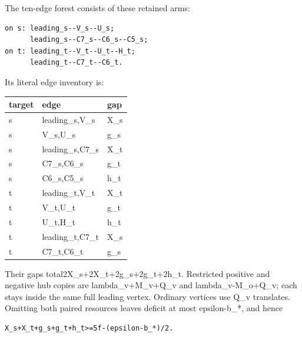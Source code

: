 \documentclass[10pt,a4paper]{article}
\theoremstyle{definition}
\begin{document}
The ten-edge forest consists of these retained arms:

\begin{lstlisting}
on s: leading_s--V_s--U_s;
      leading_s--C7_s--C6_s--C5_s;
on t: leading_t--V_t--U_t--H_t;
      leading_t--C7_t--C6_t.
\end{lstlisting}

Its literal edge inventory is:

\begin{longtable}[]{@{}lll@{}}
\toprule\noalign{}
target & edge & gap \\
\midrule\noalign{}
\endhead
\bottomrule\noalign{}
\endlastfoot
s & leading\_\allowbreak{}s,\allowbreak{}V\_\allowbreak{}s & X\_\allowbreak{}s \\
s & V\_\allowbreak{}s,\allowbreak{}U\_\allowbreak{}s & g\_\allowbreak{}s \\
s & leading\_\allowbreak{}s,\allowbreak{}C7\_\allowbreak{}s & X\_\allowbreak{}t \\
s & C7\_\allowbreak{}s,\allowbreak{}C6\_\allowbreak{}s & g\_\allowbreak{}t \\
s & C6\_\allowbreak{}s,\allowbreak{}C5\_\allowbreak{}s & h\_\allowbreak{}t \\
t & leading\_\allowbreak{}t,\allowbreak{}V\_\allowbreak{}t & X\_\allowbreak{}t \\
t & V\_\allowbreak{}t,\allowbreak{}U\_\allowbreak{}t & g\_\allowbreak{}t \\
t & U\_\allowbreak{}t,\allowbreak{}H\_\allowbreak{}t & h\_\allowbreak{}t \\
t & leading\_\allowbreak{}t,\allowbreak{}C7\_\allowbreak{}t & X\_\allowbreak{}s \\
t & C7\_\allowbreak{}t,\allowbreak{}C6\_\allowbreak{}t & g\_\allowbreak{}s \\
\end{longtable}

Their gaps total2X\_\allowbreak{}s+\allowbreak{}2X\_\allowbreak{}t+\allowbreak{}2g\_\allowbreak{}s+\allowbreak{}2g\_\allowbreak{}t+\allowbreak{}2h\_\allowbreak{}t. Restricted positive and
negative hub copies are lambda\_\allowbreak{}v+\allowbreak{}M\_\allowbreak{}v+\allowbreak{}Q\_\allowbreak{}v and lambda\_\allowbreak{}v-M\_\allowbreak{}o+\allowbreak{}Q\_\allowbreak{}v;
each stays inside the same full leading vertex. Ordinary vertices use
Q\_\allowbreak{}v translates. Omitting both paired resources leaves deficit at most
epsilon-b\_\allowbreak{}*,\allowbreak{} and hence

\begin{lstlisting}
X_s+X_t+g_s+g_t+h_t>=5f-(epsilon-b_*)/2.
\end{lstlisting}
\end{document}
